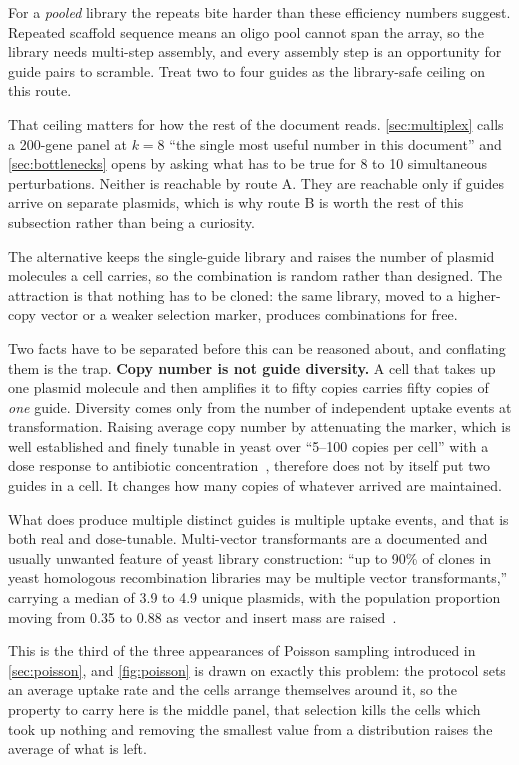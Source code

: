 For a \emph{pooled} library the repeats bite harder than these efficiency numbers
suggest. Repeated scaffold sequence means an oligo pool cannot span the array, so
the library needs multi-step assembly, and every assembly step is an opportunity
for guide pairs to scramble. Treat two to four guides as the library-safe ceiling
on this route.

That ceiling matters for how the rest of the document reads. \cref{sec:multiplex}
calls a 200-gene panel at $k=8$ ``the single most useful number in this document''
and \cref{sec:bottlenecks} opens by asking what has to be true for 8 to 10
simultaneous perturbations. Neither is reachable by route A. They are reachable
only if guides arrive on separate plasmids, which is why route B is worth the
rest of this subsection rather than being a curiosity.

 The alternative keeps the
single-guide library and raises the number of plasmid molecules a cell carries,
so the combination is random rather than designed. The attraction is that
nothing has to be cloned: the same library, moved to a higher-copy vector or a
weaker selection marker, produces combinations for free.

Two facts have to be separated before this can be reasoned about, and conflating
them is the trap. \textbf{Copy number is not guide diversity.} A cell that takes
up one plasmid molecule and then amplifies it to fifty copies carries fifty
copies of \emph{one} guide. Diversity comes only from the number of independent
uptake events at transformation. Raising average copy number by attenuating the
marker, which is well established and finely tunable in yeast over ``5--100
copies per cell'' with a dose response to antibiotic
concentration~\citep{lianConstructionPlasmidsTunable2016}, therefore does not by
itself put two guides in a cell. It changes how many copies of whatever arrived
are maintained.

What does produce multiple distinct guides is multiple uptake events, and that is
both real and dose-tunable. Multi-vector transformants are a documented and
usually unwanted feature of yeast library construction: ``up to 90\% of clones in
yeast homologous recombination libraries may be multiple vector transformants,''
carrying a median of 3.9 to 4.9 unique plasmids, with the population proportion
moving from 0.35 to 0.88 as vector and insert mass are
raised~\citep{scanlonQuantifyingResolvingMultiple2009}.

 This is the third of the three appearances
of Poisson sampling introduced in \cref{sec:poisson}, and \cref{fig:poisson} is
drawn on exactly this problem: the protocol sets an average uptake rate and the
cells arrange themselves around it, so the property to carry here is the middle
panel, that selection kills the cells which took up nothing and removing the
smallest value from a distribution raises the average of what is left.

